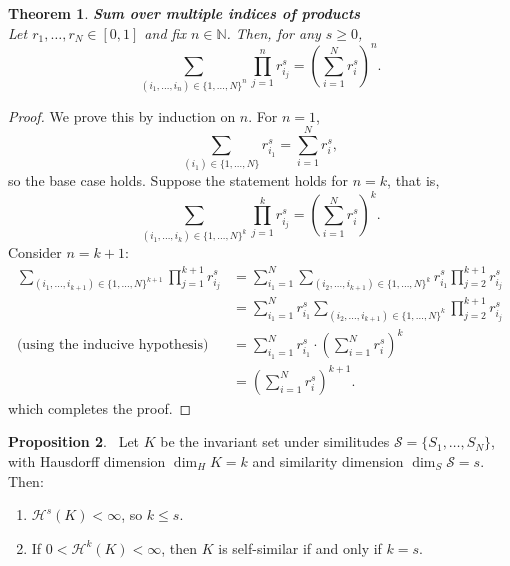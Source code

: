 \documentclass{article}
\theoremstyle{plain}
\newtheorem{thm}{Theorem}[section]
\theoremstyle{definition}
\newtheorem{prop}[thm]{Proposition}
\theoremstyle{remark}
\begin{document}
\begin{thm}{\textbf{Sum over multiple indices of products}} ~\label{thm:multi-prod}
~\\Let $r_1, \dots, r_N \in [0,1]$ and fix $n \in \mathbb{N}$. Then, for any $s \ge 0$,
\[
\sum_{(i_1,\dots,i_n) \in \{1,\dots,N\}^n} \prod_{j=1}^n r_{i_j}^s = \left( \sum_{i=1}^N r_i^s \right)^n.
\]
\end{thm}

\begin{proof}
We prove this by induction on $n$. For $n = 1$, 
\[
\sum_{(i_1) \in \{1,\dots,N\}} r_{i_1}^s = \sum_{i=1}^N r_i^s,
\]
so the base case holds. Suppose the statement holds for $n=k$, that is,
\[
\sum_{(i_1,\dots,i_k) \in \{1,\dots,N\}^k} \prod_{j=1}^k r_{i_j}^s = \left( \sum_{i=1}^N r_i^s \right)^k.
\]
Consider $n=k+1$:
\begin{align*}
\sum_{(i_1,\dots,i_{k+1}) \in \{1,\dots,N\}^{k+1}} \prod_{j=1}^{k+1} r_{i_j}^s
& = \sum_{i_1=1}^N \sum_{(i_2,\dots,i_{k+1}) \in \{1,\dots,N\}^k} r_{i_1}^s \prod_{j=2}^{k+1} r_{i_j}^s \\ & =
\sum_{i_1=1}^N r_{i_1}^s \sum_{(i_2,\dots,i_{k+1}) \in \{1,\dots,N\}^k} \prod_{j=2}^{k+1} r_{i_j}^s \\ \text{(using the inducive hypothesis)} & = \sum_{i_1=1}^N r_{i_1}^s \cdot \left( \sum_{i=1}^N r_i^s \right)^k
\\ & = \left( \sum_{i=1}^N r_i^s \right)^{k+1}.
\end{align*}
which completes the proof.
\end{proof}


\newpage

\begin{prop}~\label{prop:similar}
Let $K$ be the invariant set under similitudes $\mathcal{S} = \{S_1,\dots,S_N\}$, with Hausdorff dimension $\dim_H K = k$ and similarity dimension $\dim_S \mathcal{S} = s$. Then:
\begin{enumerate}
    \item $\mathcal{H}^s(K) < \infty$, so $k \le s$.
    \item If $0 < \mathcal{H}^k(K) < \infty$, then $K$ is self-similar if and only if $k = s$.
\end{enumerate}
\end{prop}
\end{document}
